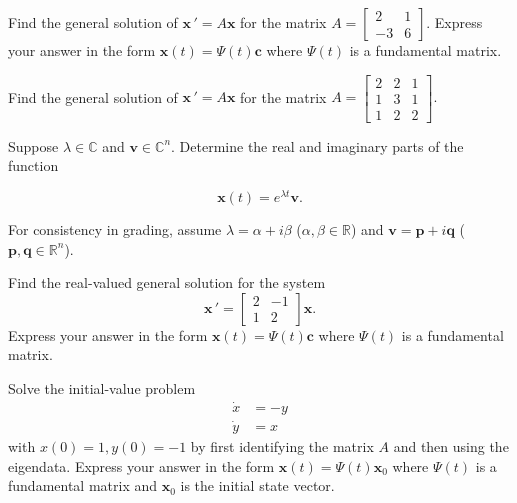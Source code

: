 \documentclass[11pt,letterpaper,boxed]{pset}
\begin{document}
    
    \begin{problem} [Exercise 1.]
    Find the general solution of $\mathbf{x} \, ' = A  \mathbf{x}$ for the matrix $A = \begin{bmatrix} 2 & 1 \\ -3 & 6 \end{bmatrix}$. Express your answer in the form $\mathbf{x}(t) = \Psi(t) \mathbf{c}$ where $\Psi(t)$ is a fundamental matrix.
    \end{problem}
    \newpage
    
    
    \begin{problem} [Exercise 2.]
    Find the general solution of $\mathbf{x} \, ' = A  \mathbf{x}$ for the matrix $A = \begin{bmatrix} 2 & 2 & 1 \\ 1 & 3 & 1 \\ 1 & 2 &2 \end{bmatrix}.$
    \end{problem}
    \newpage
    
    
    \begin{problem} [Exercise 3.]
    Suppose  $\lambda \in \mathbb{C}$  and  $\mathbf{v} \in \mathbb{C}^n$. Determine the real and imaginary parts of the  function
    
    \[  \mathbf{x}(t) = e^{\lambda t} \mathbf{v}.  \]
    
    For consistency in grading, assume $\lambda = \alpha + i \beta$   ($\alpha,\beta \in \mathbb{R}$) and $\mathbf{v} = \mathbf{p} + i \mathbf{q}$  ($\mathbf{p},\mathbf{q} \in \mathbb{R}^n$). 
    \end{problem}
    \newpage
    
    
    \begin{problem} [Exercise 4.]
    Find the real-valued general solution for the system
    \begin{equation}
    \mathbf{x} \, ' = \begin{bmatrix} 2 & -1 \\ 1 & 2 \end{bmatrix} \mathbf{x}.
     \end{equation}
    Express your answer in the form $\mathbf{x}(t) = \Psi(t) \mathbf{c}$ where $\Psi(t)$ is a fundamental matrix.
    \end{problem}
    \newpage
    
    
    
    \begin{problem} [Exercise 5.]
    Solve the initial-value problem
    \begin{align}
    \dot{x} &= -y \\
    \dot{y} &= x 
    \end{align}
    with $x(0)=1, y(0)=-1$ by first identifying the matrix $A$ and then using the eigendata. Express your answer in the form $\mathbf{x}(t) = \Psi(t) \mathbf{x}_0$ where $\Psi(t)$ is a fundamental matrix  and $\mathbf{x}_0 $ is the initial state vector.
    \end{problem}
    \newpage
    
\end{document}
